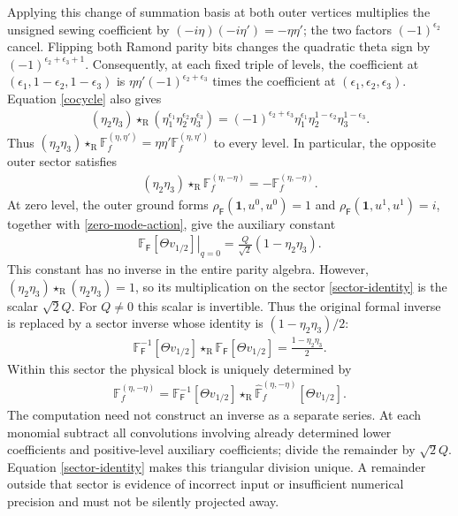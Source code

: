 \documentclass[12pt]{article}
\newcommand{\ie}{\begin{equation}\begin{aligned}}
\newcommand{\fe}{\end{aligned}\end{equation}}
\newcommand{\R}{\mathrm{R}}
\numberwithin{equation}{section}
\begin{document}
Applying this change of summation basis at both outer vertices multiplies
the unsigned sewing coefficient by $(-i\eta)(-i\eta')=-\eta\eta'$;
the two factors $(-1)^{\epsilon_2}$ cancel.  Flipping both Ramond parity
bits changes the quadratic theta sign by
$(-1)^{\epsilon_2+\epsilon_3+1}$.  Consequently, at each fixed triple
of levels, the coefficient at $(\epsilon_1,1-\epsilon_2,1-\epsilon_3)$
is $\eta\eta'(-1)^{\epsilon_2+\epsilon_3}$ times the coefficient at
$(\epsilon_1,\epsilon_2,\epsilon_3)$.  Equation \eqref{cocycle} also
gives
\ie
 (\eta_2\eta_3)\star_{\R}
 (\eta_1^{\epsilon_1}\eta_2^{\epsilon_2}\eta_3^{\epsilon_3})
 =(-1)^{\epsilon_2+\epsilon_3}
 \eta_1^{\epsilon_1}\eta_2^{1-\epsilon_2}\eta_3^{1-\epsilon_3}.
\fe
Thus $(\eta_2\eta_3)\star_{\R}\mathbb F_f^{(\eta,\eta')}
=\eta\eta'\mathbb F_f^{(\eta,\eta')}$ to every level.  In particular,
the opposite outer sector satisfies
\ie
 (\eta_2\eta_3)\star_{\R}\mathbb F_f^{(\eta,-\eta)}
 =-\mathbb F_f^{(\eta,-\eta)}.
 \label{sector-identity}
\fe
At zero level, the outer ground forms
$\rho_{\mathsf F}(\mathbf1,u^0,u^0)=1$ and
$\rho_{\mathsf F}(\mathbf1,u^1,u^1)=i$, together with
\eqref{zero-mode-action}, give the auxiliary constant
\ie
 \left.\mathbb F_{\mathsf F}[\Theta v_{1/2}]\right|_{q=0}
 =\frac{Q}{\sqrt2}(1-\eta_2\eta_3).
\fe
This constant has no inverse in the entire parity algebra.  However,
$(\eta_2\eta_3)\star_{\R}(\eta_2\eta_3)=1$, so its multiplication
on the sector \eqref{sector-identity} is the scalar $\sqrt2Q$.
For $Q\ne0$ this scalar is invertible.  Thus the original formal inverse
is replaced by a sector inverse whose identity is
$(1-\eta_2\eta_3)/2$:
\ie
 \mathbb F_{\mathsf F}^{-1}[\Theta v_{1/2}]
 \star_{\R}\mathbb F_{\mathsf F}[\Theta v_{1/2}]
 =\frac{1-\eta_2\eta_3}{2}.
\fe
Within this sector the physical block is uniquely determined by
\ie
 \mathbb F_f^{(\eta,-\eta)}
 =\mathbb F_{\mathsf F}^{-1}[\Theta v_{1/2}]
 \star_{\R}\widehat{\mathbb F}_f^{(\eta,-\eta)}[\Theta v_{1/2}].
 \label{recovery}
\fe
The computation need not construct an inverse as a separate series.
At each monomial subtract all convolutions involving already determined
lower coefficients and positive-level auxiliary coefficients; divide
the remainder by $\sqrt2Q$.  Equation \eqref{sector-identity} makes this
triangular division unique.  A remainder outside that sector is evidence
of incorrect input or insufficient numerical precision and must not be
silently projected away.




\end{document}

